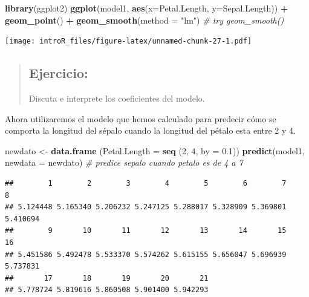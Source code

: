 \documentclass[
]{book}
\newenvironment{Shaded}{\begin{snugshade}}{\end{snugshade}}
\newcommand{\CommentTok}[1]{\textcolor[rgb]{0.56,0.35,0.01}{\textit{#1}}}
\newcommand{\DataTypeTok}[1]{\textcolor[rgb]{0.13,0.29,0.53}{#1}}
\newcommand{\DecValTok}[1]{\textcolor[rgb]{0.00,0.00,0.81}{#1}}
\newcommand{\FloatTok}[1]{\textcolor[rgb]{0.00,0.00,0.81}{#1}}
\newcommand{\KeywordTok}[1]{\textcolor[rgb]{0.13,0.29,0.53}{\textbf{#1}}}
\newcommand{\NormalTok}[1]{#1}
\newcommand{\OperatorTok}[1]{\textcolor[rgb]{0.81,0.36,0.00}{\textbf{#1}}}
\newcommand{\StringTok}[1]{\textcolor[rgb]{0.31,0.60,0.02}{#1}}
\begin{document}
\begin{Shaded}
\begin{Highlighting}[]
\KeywordTok{library}\NormalTok{(ggplot2)}
\KeywordTok{ggplot}\NormalTok{(model1, }\KeywordTok{aes}\NormalTok{(}\DataTypeTok{x=}\NormalTok{Petal.Length, }\DataTypeTok{y=}\NormalTok{Sepal.Length)) }\OperatorTok{+}\StringTok{ }\KeywordTok{geom_point}\NormalTok{() }\OperatorTok{+}\StringTok{ }
\StringTok{  }\KeywordTok{geom_smooth}\NormalTok{(}\DataTypeTok{method =} \StringTok{"lm"}\NormalTok{) }\CommentTok{# try geom_smooth()}
\end{Highlighting}
\end{Shaded}

\texttt{[image: introR\_files/figure-latex/unnamed-chunk-27-1.pdf]}

\begin{quote}
\hypertarget{ejercicio-3}{%
\subsection{Ejercicio:}\label{ejercicio-3}}

Discuta e interprete los coeficientes del modelo.
\end{quote}

Ahora utilizaremos el modelo que hemos calculado para predecir cómo se comporta la longitud del sépalo cuando la longitud del pétalo esta entre 2 y 4.

\begin{Shaded}
\begin{Highlighting}[]
\NormalTok{newdato <-}\StringTok{ }\KeywordTok{data.frame}\NormalTok{ (}\DataTypeTok{Petal.Length =} \KeywordTok{seq}\NormalTok{ (}\DecValTok{2}\NormalTok{, }\DecValTok{4}\NormalTok{, }\DataTypeTok{by =} \FloatTok{0.1}\NormalTok{))}
\KeywordTok{predict}\NormalTok{(model1, }\DataTypeTok{newdata =}\NormalTok{ newdato) }\CommentTok{# predice sepalo cuando petalo es de 4 a 7}
\end{Highlighting}
\end{Shaded}

\begin{verbatim}
##        1        2        3        4        5        6        7        8 
## 5.124448 5.165340 5.206232 5.247125 5.288017 5.328909 5.369801 5.410694 
##        9       10       11       12       13       14       15       16 
## 5.451586 5.492478 5.533370 5.574262 5.615155 5.656047 5.696939 5.737831 
##       17       18       19       20       21 
## 5.778724 5.819616 5.860508 5.901400 5.942293
\end{verbatim}
\end{document}
